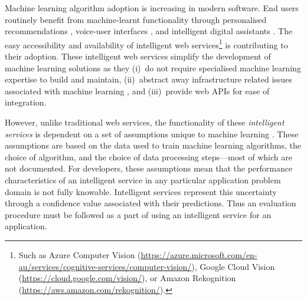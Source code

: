 Machine learning algorithm adoption is increasing in modern software. End users routinely benefit from machine-learnt functionality through personalised recommendations \citep{covington2016deep}, voice-user interfaces \citep{myers2018patterns}, and intelligent digital assistants \citep{boyd2018just}. The easy accessibility and availability of intelligent web services\footnote{Such as Azure Computer Vision (\url{https://azure.microsoft.com/en-au/services/cognitive-services/computer-vision/}), Google Cloud Vision (\url{https://cloud.google.com/vision/}), or Amazon Rekognition (\url{https://aws.amazon.com/rekognition/}).} is contributing to their adoption. These intelligent web services simplify the development of machine learning solutions as they (i)~do not require specialised machine learning expertise to build and maintain, (ii)~abstract away infrastructure related issues associated with machine learning \citep{Sculley2015, Arpteg2018}, and (iii)~provide web APIs for ease of integration. 

However, unlike traditional web services, the functionality of these \emph{intelligent services} is dependent on a set of assumptions unique to machine learning \citep{Cummaudo:2019icsme}. These assumptions are based on the data used to train machine learning algorithms, the choice of algorithm, and the choice of data processing steps---most of which are not documented. For developers, these assumptions mean that the performance characteristics of an intelligent service in any particular application problem domain is not fully knowable. Intelligent services represent this uncertainty through a confidence value associated with their predictions. Thus an evaluation procedure must be followed as a part of using an intelligent service for an application.  

